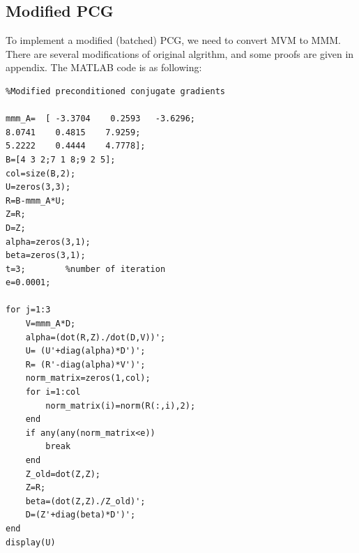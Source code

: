 \documentclass{article} %
\begin{document}
\subsection{Modified PCG}
To implement a modified (batched) PCG, we need to convert MVM to MMM. There are several modifications of original algrithm, and some proofs are given in appendix. The MATLAB code is as following:
\begin{lstlisting}
%Modified preconditioned conjugate gradients

mmm_A=  [ -3.3704    0.2593   -3.6296;
8.0741    0.4815    7.9259;
5.2222    0.4444    4.7778];
B=[4 3 2;7 1 8;9 2 5];
col=size(B,2);
U=zeros(3,3);
R=B-mmm_A*U;
Z=R;
D=Z;
alpha=zeros(3,1);
beta=zeros(3,1);
t=3;        %number of iteration
e=0.0001;

for j=1:3
	V=mmm_A*D;
	alpha=(dot(R,Z)./dot(D,V))';
	U= (U'+diag(alpha)*D')';
	R= (R'-diag(alpha)*V')';
	norm_matrix=zeros(1,col);
	for i=1:col
		norm_matrix(i)=norm(R(:,i),2);
	end
	if any(any(norm_matrix<e))
		break
	end
	Z_old=dot(Z,Z);
	Z=R;
	beta=(dot(Z,Z)./Z_old)';
	D=(Z'+diag(beta)*D')';
end
display(U)
\end{lstlisting}
\end{document}
